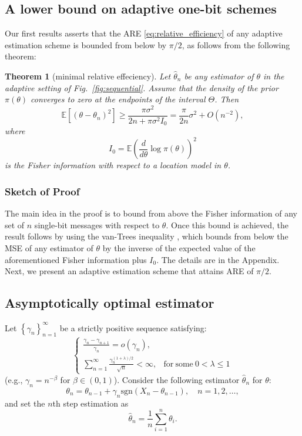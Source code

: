 \documentclass[letterpaper, conference,9pt]{IEEEtran}      %
\newtheorem{thm}{\bf{Theorem}}
\newcommand{\sgn}{\mathrm{sgn} }
\begin{document}
\subsection{A lower bound on adaptive one-bit schemes}
Our first results asserts that the ARE \eqref{eq:relative_efficiency} of any adaptive estimation scheme is bounded from below by $\pi/2$, as follows from the following theorem:
\begin{thm}[minimal relative effeciency] \label{thm:adpative_lower_bound}
Let $\widehat{\theta}_n$ be any estimator of $\theta$ in the adaptive setting of Fig.~\ref{fig:sequential}. Assume that the density of the prior $\pi(\theta)$ converges to zero at the endpoints of the interval $\Theta$. Then
\[
\mathbb E\left[ (\theta-\theta_n)^2 \right] \geq  \frac{\pi \sigma^2 }{2n +\pi \sigma^2  I_0}  =  \frac{\pi}{2n}\sigma^2+O(n^{-2}),
\]
where 
\[
I_0 = \mathbb E \left( \frac{d}{d\theta} \log \pi (\theta) \right)^2
\]
is the Fisher information with respect to a location model in $\theta$. 
\end{thm}

\subsubsection*{Sketch of Proof}
The main idea in the proof is to bound from above the Fisher information of any set of $n$ single-bit messages with respect to $\theta$. Once this bound is achieved, the result follows by using the van-Trees inequality \cite[Thm. 2.13]{tsybakov2008introduction},\cite{gill1995applications} which bounds from below the MSE of any estimator of $\theta$ by the inverse of the expected value of the aforementioned Fisher information plus $I_0$. The details are in the Appendix.\\

Next, we present an adaptive estimation scheme that attains ARE of $\pi/2$. 
\subsection{Asymptotically optimal estimator}
Let $\left\{\gamma_n \right\}_{n=1}^\infty$ be a strictly positive sequence satisfying:
\begin{equation} \label{eq:conditions}
\begin{cases}
\frac{\gamma_n - \gamma_{n+1}}{\gamma_n} = o(\gamma_n), &  \\
\sum_{n=1}^\infty \frac{\gamma_n^{(1+\lambda)/2}} {\sqrt{n}} < \infty, & 
\mathrm{for~some~}0< \lambda \leq 1
\end{cases}
\end{equation}
(e.g., $\gamma_n = n^{-\beta}$ for $\beta \in (0,1)$). Consider the following estimator $\widehat{\theta}_n$ for $\theta$:  
\begin{equation}
\label{eq:sgd_alg}
\theta_n = \theta_{n-1} +  \gamma_n \sgn (X_n - \theta_{n-1}), \quad n = 1,2,\ldots,
\end{equation}
and set the $n$th step estimation as
\begin{equation} \label{eq:sgd_est}
\widehat{\theta}_n =  \frac{1}{n} \sum_{i=1}^n  \theta_i. 
\end{equation}
\end{document}
